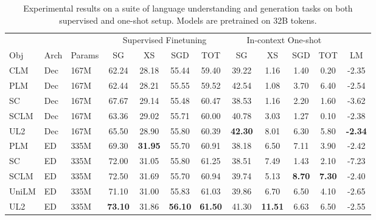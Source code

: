 \documentclass[10pt]{article}
\begin{document}
\begin{table*}[]
    \centering
    \small
    \caption{Experimental results on a suite of language understanding and generation tasks on both supervised and one-shot setup. Models are pretrained on 32B tokens.}
\label{tab:raw_scores}
    \begin{tabular}{lllccccccccc}
    \toprule
        & & &\multicolumn{4}{c}{Supervised Finetuning} & \multicolumn{4}{c}{In-context One-shot}\\
        Obj &  Arch &  Params &SG & XS & SGD & TOT & SG & XS & SGD & TOT   & LM  \\
        \midrule
  CLM       & Dec & 167M & 62.24 & 	28.18& 	55.44 & 	59.40 & 	39.22	&  1.16 & 	1.40 & 	0.20 & 	-2.35 \\ 
  PLM & Dec & 167M  & 62.44 &	28.21 &	55.55 &	59.52 &	42.54 &	1.08 & 	3.70	& 6.40 &	-2.54\\
  SC & Dec & 167M  &67.67 &	29.14	& 55.48 	& 	60.47 	& 	38.53 	& 	1.16 	& 	2.20 	& 	1.60 	& 	-3.62 \\ 
  SCLM & Dec & 167M & 63.36 &	29.02 &	55.71 &	60.00 &	40.78 &	3.03 &	1.27 &	0.10 &	-2.38	 \\
  UL2 & Dec & 167M &  65.50	& 28.90	 &  55.80 & 	60.39 & 	\textbf{42.30} & 	8.01 & 	6.30 & 	5.80 & 	\textbf{-2.34} \\
  \midrule 
  PLM & ED & 335M & 69.30	& \textbf{31.95} & 	55.70& 	60.91& 	38.18& 	6.50& 	7.11& 	3.90& 	-2.42 \\ 
  SC & ED & 335M &  72.00	&  31.05 & 	55.80 & 	61.25 & 	38.51 & 	7.49 & 	1.43 & 	2.10 & 	-7.23 \\
  SCLM & ED &  335M & 72.50	 & 31.69 &	55.70 &	60.94 &	39.74 &	5.13&	\textbf{8.70}&	\textbf{7.30}&	-2.40 \\
  UniLM & ED &  335M &  71.10 &	31.00 &	55.83 &	61.03 &	39.86 &	6.70	&6.50&	4.10&	-2.65 \\
  UL2 & ED & 335M &  \textbf{73.10} &	31.86&	\textbf{56.10}&	\textbf{61.50}&	41.30&	\textbf{11.51}&	6.63	&6.50	& -2.55\\ 
  \bottomrule 
    \end{tabular}
    
\end{table*}
\end{document}
